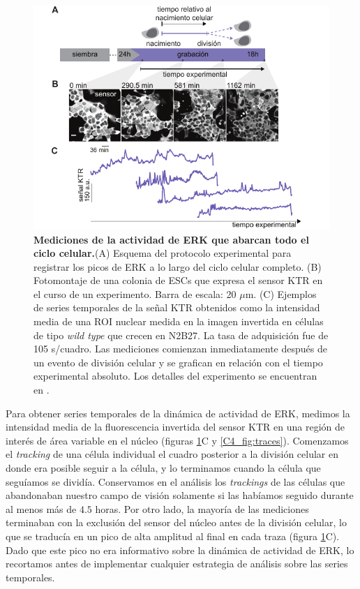 \documentclass[./main.tex]{subfiles}
\begin{document}
\begin{figure}
    \centering
    \includegraphics[width=1\columnwidth]{figures/chapter4/C4_experiment.pdf}
    \caption{\textbf{Mediciones de la actividad de ERK que abarcan todo el ciclo celular.}(A) Esquema del protocolo experimental para registrar los picos de ERK a lo largo del ciclo celular completo. (B) Fotomontaje de una colonia de ESCs que expresa el sensor KTR en el curso de un experimento. Barra de escala: 20 $\mu$m. (C) Ejemplos de series temporales de la señal KTR obtenidos como la intensidad media de una ROI nuclear medida en la imagen invertida en células de tipo \textit{wild type} que crecen en N2B27. La tasa de adquisición fue de 105 s/cuadro. Las mediciones comienzan inmediatamente después de un evento de división celular y se grafican en relación con el tiempo experimental absoluto. Los detalles del experimento se encuentran en \cite{Fabris2022}.}
    \label{C4_fig:experiment}
\end{figure}

Para obtener series temporales de la dinámica de actividad de ERK, medimos la intensidad media de la fluorescencia invertida del sensor KTR en una región de interés de área variable en el núcleo (figuras \ref{C4_fig:experiment}C y \ref{C4_fig:traces}). Comenzamos el \textit{tracking} de una célula individual el cuadro posterior a la división celular en donde era posible seguir a la célula, y lo terminamos cuando la célula que seguíamos se dividía. Conservamos en el análisis los \textit{trackings} de las células que abandonaban nuestro campo de visión solamente si las habíamos seguido durante al menos más de $4.5$ horas. Por otro lado, la mayoría de las mediciones terminaban con la exclusión del sensor del núcleo antes de la división celular, lo que se traducía en un pico de alta amplitud al final en cada traza (figura \ref{C4_fig:experiment}C). Dado que este pico no era informativo sobre la dinámica de actividad de ERK, lo recortamos antes de implementar cualquier estrategia de análisis sobre las series temporales. 
\end{document}
